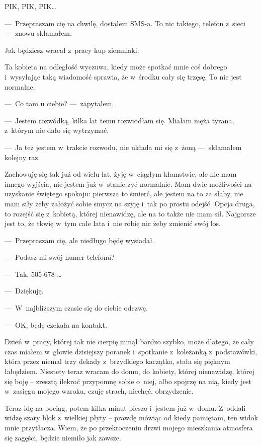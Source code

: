 PIK, PIK, PIK…
 
---~Przepraszam cię na chwilę, dostałem SMS-a. To nic takiego, telefon z~sieci ---~znowu skłamałem.

\begin{itquote}
Jak będziesz wracał z~pracy kup ziemniaki.
\end{itquote}

Ta kobieta na odległość wyczuwa, kiedy może spotkać mnie coś dobrego i~wysyłając taką wiadomość sprawia, że w~środku cały się trzęsę. To nie jest normalne.

---~Co tam u ciebie? ---~zapytałem.

---~Jestem rozwódką, kilka lat temu rozwiodłam się. Miałam męża tyrana, z~którym nie dało się wytrzymać.

---~Ja też jestem w~trakcie rozwodu, nie układa mi się z~żoną ---~skłamałem kolejny raz.

Zachowuję się tak już od wielu lat, żyję w~ciągłym kłamstwie, ale nie mam innego wyjścia, nie jestem już w~stanie żyć normalnie. Mam dwie możliwości na uzyskanie świętego spokoju: pierwsza to śmierć, ale jestem na to za słaby, nie mam siły żeby założyć sobie smycz na szyję i~tak po prostu odejść. Opcja druga, to rozejść się z~kobietą, której nienawidzę, ale na to także nie mam sił. Najgorsze jest to, że tkwię w~tym całe lata i~nie robię nic żeby zmienić swój los.

---~Przepraszam cię, ale niedługo będę wysiadał.

---~Podasz mi swój numer telefonu?

---~Tak, 505-678-…

---~Dziękuję.

---~W~najbliższym czasie się do ciebie odezwę.

---~OK, będę czekała na kontakt.

Dzień w~pracy, której tak nie cierpię minął bardzo szybko, może dlatego, że cały czas miałem w~głowie dzisiejszy poranek i~spotkanie z~koleżanką z~podstawówki, która przez niemal trzy dekady z~brzydkiego kaczątka, stała się pięknym łabędziem. Niestety teraz wracam do domu, do kobiety, której nienawidzę, której się boję -- zresztą ilekroć przypomnę sobie o~niej, albo spojrzę na nią, kiedy jest w~zasięgu mojego wzroku, czuję strach, niechęć, obrzydzenie.

Teraz idę na pociąg, potem kilka minut pieszo i~jestem już w~domu. Z~oddali widzę szary blok z~wielkiej płyty -- prawdę mówiąc od kiedy pamiętam, ten widok mnie przytłacza. Wiem, że po przekroczeniu drzwi mojego mieszkania atmosfera się zagęści, będzie niemiło jak zawsze.


